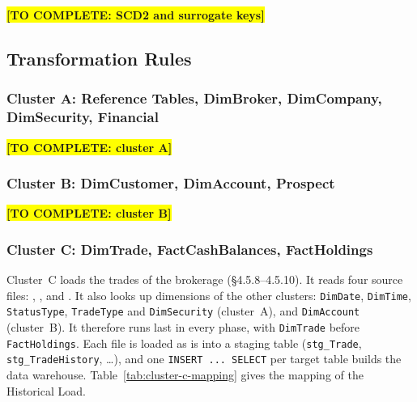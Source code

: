 \documentclass[11pt,a4paper]{article}
\newcommand{\code}[1]{\texttt{#1}}           %
\newcommand{\todo}[1]{\colorbox{yellow}{\textbf{[TO COMPLETE: #1]}}}
\begin{document}
\todo{SCD2 and surrogate keys}

\subsection{Transformation Rules}
\label{sec:transformations}

\subsubsection{Cluster A: Reference Tables, DimBroker, DimCompany, DimSecurity, Financial}
\todo{cluster A}

\subsubsection{Cluster B: DimCustomer, DimAccount, Prospect}
\todo{cluster B}

\subsubsection{Cluster C: DimTrade, FactCashBalances, FactHoldings}
Cluster~C loads the trades of the brokerage (\S4.5.8--4.5.10). It reads
four source files: , ,
 and . It also looks up
dimensions of the other clusters: \code{DimDate}, \code{DimTime},
\code{StatusType}, \code{TradeType} and \code{DimSecurity} (cluster~A), and
\code{DimAccount} (cluster~B). It therefore runs last in every phase, with
\code{DimTrade} before \code{FactHoldings}. Each file is loaded as is into a
staging table (\code{stg\_Trade}, \code{stg\_TradeHistory}, \ldots), and one
\code{INSERT ... SELECT} per target table builds the data warehouse.
Table~\ref{tab:cluster-c-mapping} gives the mapping of the Historical Load.
\end{document}
